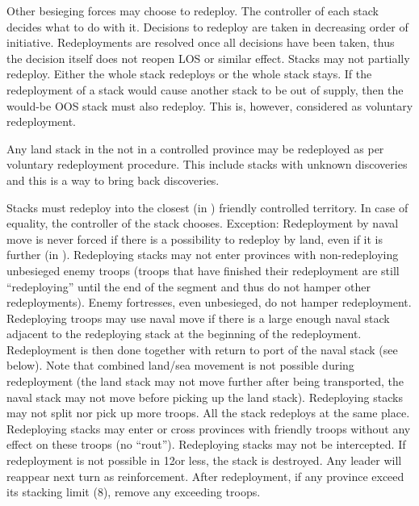 \bparag Other besieging forces may choose to redeploy. The controller of each
stack decides what to do with it.
\bparag Decisions to redeploy are taken in decreasing order of
initiative. Redeployments are resolved once all decisions have been taken,
thus the decision itself does not reopen LOS or similar effect.
\bparag Stacks may not partially redeploy. Either the whole stack redeploys or
the whole stack stays.
\bparag If the redeployment of a stack would cause another stack to be out of
supply, then the would-be OOS stack must also redeploy. This is, however,
considered as voluntary redeployment.

\bparag Any land stack in the \ROTW not in a controlled province may be
redeployed as per voluntary redeployment procedure.
\bparag This include stacks with unknown discoveries and this is a way to
bring back discoveries.

\bparag Stacks must redeploy into the closest (in \MP) friendly controlled
territory. In case of equality, the controller of the stack chooses.
\bparag Exception: Redeployment by naval move is never forced if there is a
possibility to redeploy by land, even if it is further (in \MP).
\bparag Redeploying stacks may not enter provinces with non-redeploying
unbesieged enemy troops (troops that have finished their redeployment are
still ``redeploying'' until the end of the segment and thus do not hamper
other redeployments). Enemy fortresses, even unbesieged, do not hamper
redeployment.
\bparag Redeploying troops may use naval move if there is a large enough naval
stack adjacent to the redeploying stack at the beginning of the
redeployment. Redeployment is then done together with return to port of the
naval stack (see below). Note that combined land/sea movement is not possible
during redeployment (the land stack may not move further after being
transported, the naval stack may not move before picking up the land stack).
\bparag Redeploying stacks may not split nor pick up more troops. All the
stack redeploys at the same place.
\bparag Redeploying stacks may enter or cross provinces with friendly troops
without any effect on these troops (no ``rout'').
\bparag Redeploying stacks may not be intercepted.
\bparag If redeployment is not possible in 12\MP or less, the stack is
destroyed. Any leader will reappear next turn as reinforcement.
\bparag After redeployment, if any province exceed its stacking limit (8\LD),
remove any exceeding troops.

